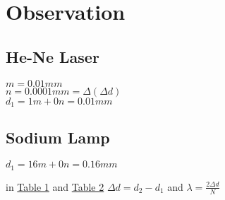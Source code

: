 \section{Observation}

    \subsection{He-Ne Laser}

    $m = 0.01mm$\\
    \indent $n = 0.0001mm = \Delta (\Delta d)$\\
    \indent $d_1 = 1m+0n = 0.01mm$\\
    


    \subsection{Sodium Lamp}

        $d_1 = 16m+0n = 0.16mm$
        
    in \hyperref[tab:hene]{Table 1} and \hyperref[tab:na]{Table 2} $\Delta d = d_2-d_1$ and $\lambda = \frac{2\Delta d}{N}$